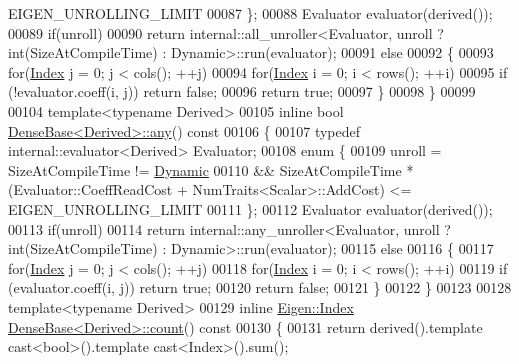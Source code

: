 \begin{DoxyCode}
      EIGEN\_UNROLLING\_LIMIT
00087   \};
00088   Evaluator evaluator(derived());
00089   \textcolor{keywordflow}{if}(unroll)
00090     \textcolor{keywordflow}{return} internal::all\_unroller<Evaluator, unroll ? int(SizeAtCompileTime) : Dynamic>::run(evaluator);
00091   \textcolor{keywordflow}{else}
00092   \{
00093     \textcolor{keywordflow}{for}(\hyperlink{namespace_eigen_a62e77e0933482dafde8fe197d9a2cfde}{Index} j = 0; j < cols(); ++j)
00094       \textcolor{keywordflow}{for}(\hyperlink{namespace_eigen_a62e77e0933482dafde8fe197d9a2cfde}{Index} i = 0; i < rows(); ++i)
00095         \textcolor{keywordflow}{if} (!evaluator.coeff(i, j)) \textcolor{keywordflow}{return} \textcolor{keyword}{false};
00096     \textcolor{keywordflow}{return} \textcolor{keyword}{true};
00097   \}
00098 \}
00099 
00104 \textcolor{keyword}{template}<\textcolor{keyword}{typename} Derived>
00105 \textcolor{keyword}{inline} \textcolor{keywordtype}{bool} \hyperlink{group___core___module_abfbf4cb72dd577e62fbe035b1c53e695}{DenseBase<Derived>::any}()\textcolor{keyword}{ const}
00106 \textcolor{keyword}{}\{
00107   \textcolor{keyword}{typedef} internal::evaluator<Derived> Evaluator;
00108   \textcolor{keyword}{enum} \{
00109     unroll = SizeAtCompileTime != \hyperlink{namespace_eigen_ad81fa7195215a0ce30017dfac309f0b2}{Dynamic}
00110           && SizeAtCompileTime * (Evaluator::CoeffReadCost + NumTraits<Scalar>::AddCost) <= 
      EIGEN\_UNROLLING\_LIMIT
00111   \};
00112   Evaluator evaluator(derived());
00113   \textcolor{keywordflow}{if}(unroll)
00114     \textcolor{keywordflow}{return} internal::any\_unroller<Evaluator, unroll ? int(SizeAtCompileTime) : Dynamic>::run(evaluator);
00115   \textcolor{keywordflow}{else}
00116   \{
00117     \textcolor{keywordflow}{for}(\hyperlink{namespace_eigen_a62e77e0933482dafde8fe197d9a2cfde}{Index} j = 0; j < cols(); ++j)
00118       \textcolor{keywordflow}{for}(\hyperlink{namespace_eigen_a62e77e0933482dafde8fe197d9a2cfde}{Index} i = 0; i < rows(); ++i)
00119         \textcolor{keywordflow}{if} (evaluator.coeff(i, j)) \textcolor{keywordflow}{return} \textcolor{keyword}{true};
00120     \textcolor{keywordflow}{return} \textcolor{keyword}{false};
00121   \}
00122 \}
00123 
00128 \textcolor{keyword}{template}<\textcolor{keyword}{typename} Derived>
00129 \textcolor{keyword}{inline} \hyperlink{namespace_eigen_a62e77e0933482dafde8fe197d9a2cfde}{Eigen::Index} \hyperlink{group___core___module_a229be090c665b9bf7d1fcdfd1ab6e0c1}{DenseBase<Derived>::count}()\textcolor{keyword}{ const}
00130 \textcolor{keyword}{}\{
00131   \textcolor{keywordflow}{return} derived().template cast<bool>().\textcolor{keyword}{template} cast<Index>().sum();

\end{DoxyCode}
